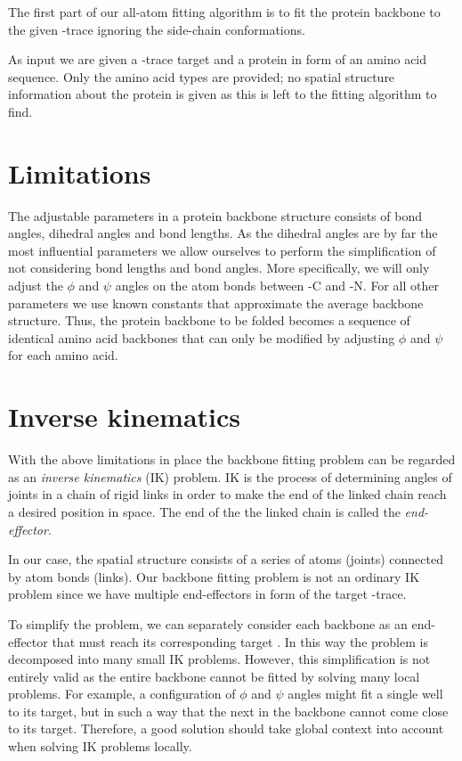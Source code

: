 The first part of our all-atom fitting algorithm is to fit the protein backbone to the given \Ca-trace ignoring the side-chain conformations.

As input we are given a \Ca-trace target and a protein in form of an amino acid sequence.
Only the amino acid types are provided; no spatial structure information about the protein is given as this is left to the fitting algorithm to find.


\section{Limitations}
The adjustable parameters in a protein backbone structure consists of bond angles, dihedral angles and bond lengths.
As the dihedral angles are by far the most influential parameters we allow ourselves to perform the simplification of not considering bond lengths and bond angles.
More specifically, we will only adjust the $\phi$ and $\psi$ angles on the atom bonds between \Ca-C and \Ca-N.
For all other parameters we use known constants that approximate the average backbone structure.
Thus, the protein backbone to be folded becomes a sequence of identical amino acid backbones that can only be modified by adjusting $\phi$ and $\psi$ for each amino acid.


\section{Inverse kinematics}
With the above limitations in place the backbone fitting problem can be regarded as an \emph{inverse kinematics} (IK) problem.
IK is the process of determining angles of joints in a chain of rigid links in order to make the end of the linked chain reach a desired position in space.
The end of the the linked chain is called the \emph{end-effector}.

In our case, the spatial structure consists of a series of atoms (joints) connected by atom bonds (links).
Our backbone fitting problem is not an ordinary IK problem since we have multiple end-effectors in form of the target \Ca-trace.

To simplify the problem, we can separately consider each backbone \Ca as an end-effector that must reach its corresponding target \Ca.
In this way the problem is decomposed into many small IK problems.
However, this simplification is not entirely valid as the entire backbone cannot be fitted by solving many local problems.
For example, a configuration of $\phi$ and $\psi$ angles might fit a single \Ca well to its target, but in such a way that the next \Ca in the backbone cannot come close to its target.
Therefore, a good solution should take global context into account when solving IK problems locally. 

